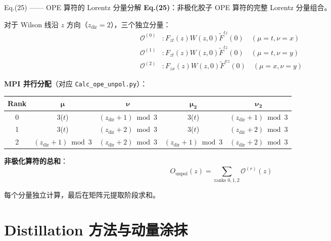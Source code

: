 \documentclass[10pt,aspectratio=169]{beamer}
\begin{document}
\begin{frame}{Eq.(25) —— OPE 算符的 Lorentz 分量分解}
\small
\textbf{Eq.(25)}：非极化胶子 OPE 算符的完整 Lorentz 分量组合。

对于 Wilson 线沿 $z$ 方向（$z_{\text{dir}}=2$），三个独立分量：
\begin{align}
  \mathcal{O}^{(0)} &: F_{zt}(z) W(z,0) \tilde{F}^{tz}(0) \quad (\mu{=}t, \nu{=}x) \\
  \mathcal{O}^{(1)} &: F_{zt}(z) W(z,0) \tilde{F}^{tz}(0) \quad (\mu{=}t, \nu{=}y) \\
  \mathcal{O}^{(2)} &: F_{zx}(z) W(z,0) \tilde{F}^{xz}(0) \quad (\mu{=}x, \nu{=}y)
\end{align}

\textbf{MPI 并行分配}（对应 \texttt{Calc\_ope\_unpol.py}）：
\begin{center}
\begin{tabular}{c|c|c|c|c}
  \toprule
  \textbf{Rank} & $\bm{\mu}$ & $\bm{\nu}$ & $\bm{\mu_2}$ & $\bm{\nu_2}$ \\
  \midrule
  0 & 3($t$) & $(z_{\text{dir}}+1)\bmod 3$ & 3($t$) & $(z_{\text{dir}}+1)\bmod 3$ \\
  1 & 3($t$) & $(z_{\text{dir}}+2)\bmod 3$ & 3($t$) & $(z_{\text{dir}}+2)\bmod 3$ \\
  2 & $(z_{\text{dir}}+1)\bmod 3$ & $(z_{\text{dir}}+2)\bmod 3$ & $(z_{\text{dir}}+1)\bmod 3$ & $(z_{\text{dir}}+2)\bmod 3$ \\
  \bottomrule
\end{tabular}
\end{center}

\textbf{非极化算符的总和}：
\begin{equation}
  \boxed{
  O_{\text{unpol}}(z) = \sum_{\text{ranks } 0,1,2} \mathcal{O}^{(r)}(z)
  }
\end{equation}

每个分量独立计算，最后在矩阵元提取阶段求和。
\end{frame}

\section{Distillation 方法与动量涂抹}
\end{document}
